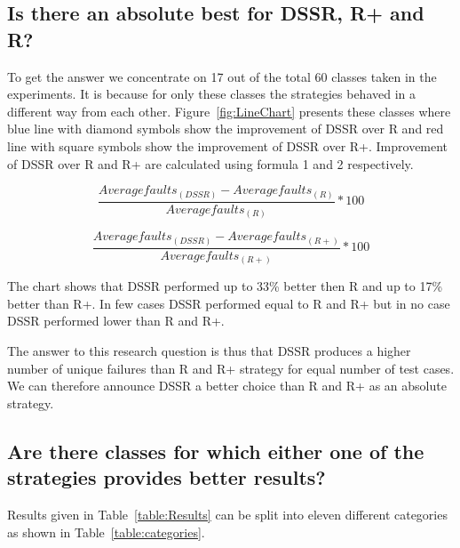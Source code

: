 \documentclass{acm_proc_article-sp}
\begin{document}
\subsection{Is there an absolute best for DSSR, R+ and R?}
To get the answer we concentrate on 17 out of the total 60 classes taken in the experiments. It is because for only these classes the strategies behaved in a different way from each other. Figure~\ref{fig:LineChart} presents these classes where blue line with diamond symbols show the improvement of DSSR over R and red line with square symbols show the improvement of DSSR over R+. Improvement of DSSR over R and R+ are calculated using formula 1 and 2 respectively.

\begin{equation} \frac{Averagefaults_{(DSSR)} - Averagefaults_{(R)}}{Averagefaults_{(R)}} * 100  \end{equation}

\begin{equation} \frac{Averagefaults_{(DSSR)} - Averagefaults_{(R+)}}{Averagefaults_{(R+)}}  * 100 \end{equation}

The chart shows that DSSR performed up to 33\% better then R and up to 17\% better than R+. In few cases DSSR performed equal to R and R+ but in no case DSSR performed lower than R and R+. 

The answer to this research question is thus that DSSR produces a higher number of unique failures than R and R+ strategy for equal number of test cases. We can therefore announce DSSR a better choice than R and R+ as an absolute strategy. 


\subsection{Are there classes for which either one of the strategies provides better results?}

Results given in Table~\ref{table:Results} can be split into eleven different categories as shown in Table~\ref{table:categories}. %
\end{document}
